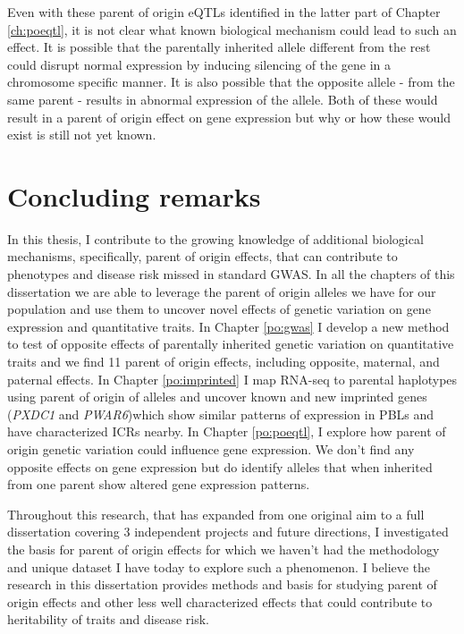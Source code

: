  Even with these parent of origin eQTLs identified in the latter part of Chapter \ref{ch:poeqtl}, it is not clear what known biological mechanism could lead to such an effect. It is possible that the parentally inherited allele different from the rest could disrupt normal expression by inducing silencing of the gene in a chromosome specific manner. It is also possible that the opposite allele - from the same parent - results in abnormal expression of the allele. Both of these would result in a parent of origin effect on gene expression but why or how these would exist is still not yet known. 

\section{Concluding remarks}

In this thesis, I contribute to the growing knowledge of additional biological mechanisms, specifically, parent of origin effects, that can contribute to phenotypes and disease risk missed in standard GWAS. In all the chapters of this dissertation we are able to leverage the parent of origin alleles we have for our population and use them to uncover novel effects of genetic variation on gene expression and quantitative traits. In Chapter \ref{po:gwas} I develop a new method to test of opposite effects of parentally inherited genetic variation on quantitative traits and we find 11 parent of origin effects, including opposite, maternal, and paternal effects. In Chapter \ref{po:imprinted} I map RNA-seq to parental haplotypes using parent of origin of alleles and uncover known and new imprinted genes (\emph{PXDC1} and \emph{PWAR6})which show similar patterns of expression in PBLs and have characterized ICRs nearby. In Chapter \ref{po:poeqtl}, I explore how parent of origin genetic variation could influence gene expression. We don't find any opposite effects on gene expression but do identify alleles that when inherited from one parent show altered gene expression patterns. 

Throughout this research, that has expanded from one original aim to a full dissertation covering 3 independent projects and future directions, I investigated the basis for parent of origin effects for which we haven't had the methodology and unique dataset I have today to explore such a phenomenon. I believe the research in this dissertation provides methods and basis for studying parent of origin effects and other less well characterized effects that could contribute to heritability of traits and disease risk.




